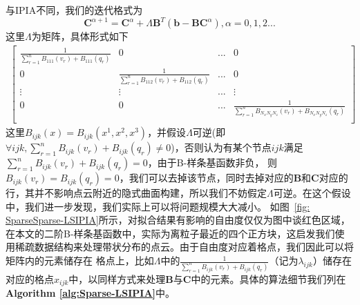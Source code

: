 与IPIA不同，我们的迭代格式为
\begin{equation}
\mathbf{C}^{\alpha + 1} = \mathbf{C}^{\alpha} + \Lambda \mathbf{B}^T(\mathbf{b} - \mathbf{B}\mathbf{C}^{\alpha}) , \alpha = 0,1,2...
\end{equation}
这里$\Lambda$为矩阵，具体形式如下
\begin{equation}
    \begin{split}
        \begin{bmatrix}
            \frac{1}{\sum_{r = 1}^n B_{111}(v_r) +B_{111}(q_r)} & 0 & ... & 0\\
            0 & \frac{1}{\sum_{r = 1}^n B_{112}(v_r) +B_{112}(q_r)} & ... & 0\\
            \vdots & \vdots & ... & \vdots \\
            0 & 0 & ... & \frac{1}{\sum_{r = 1}^n B_{N_xN_yN_z}(v_r) + B_{N_xN_yN_z}(q_r)} \\
        \end{bmatrix}
    \end{split}
\end{equation}
这里$B_{ijk}(x) = B_{ijk}(x^1,x^2,x^3)$，并假设$\Lambda$可逆(即$\forall ijk ,\sum_{r = 1}^n B_{ijk}(v_r) +B_{ijk}(q_r) \neq 0$)，否则认为有某个节点$ijk$满足$\sum_{r = 1}^n B_{ijk}(v_r) +B_{ijk}(q_r) = 0$，由于B-样条基函数非负，
则$B_{ijk}(v_r) = B_{ijk}(q_r) = 0$，我们可以去掉该节点，同时去掉对应的$\mathbf{B}$和$\mathbf{C}$对应的行，其并不影响点云附近的隐式曲面构建，所以我们不妨假定$\Lambda$可逆。在这个假设中，我们进一步发现，我们实际上可以将问题规模大大减小。
如图~\ref{fig: SparseSparse-LSIPIA}所示，对拟合结果有影响的自由度仅仅为图中谈红色区域，在本文的二阶B-样条基函数中，实际为离粒子最近的四个正方块，这启发我们使用稀疏数据结构来处理带状分布的点云。由于自由度对应着格点，我们因此可以将矩阵内的元素储存在
格点上，比如$\Lambda$中的$\frac{1}{\sum_{r = 1}^n B_{ijk}(v_r) + B_{ijk}(q_r)}$（记为$\lambda_{ijk}$）储存在对应的格点$x_{ijk}$中，以同样方式来处理$\mathbf{B}$与$\mathbf{C}$中的元素。具体的算法细节我们列在\textbf{Algorithm \ref{alg:Sparse-LSIPIA}}中。

